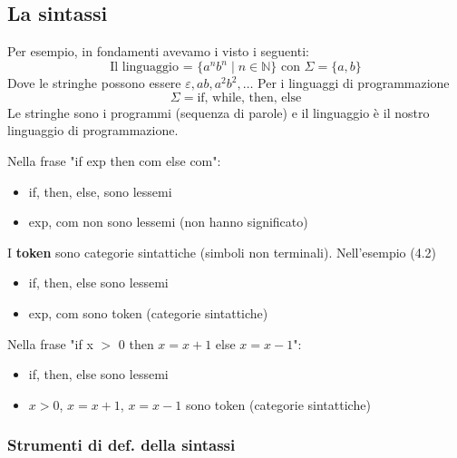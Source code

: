 \documentclass[a4paper]{article}
\begin{document}
\subsection{La sintassi}


\ex{}
{
    Per esempio, in fondamenti avevamo i visto i seguenti:
    \[\text{Il linguaggio = } \{a^nb^n \; | \; n \in \mathbb{N}\} \text{ con } \Sigma = \{a,b\}\]
    Dove le stringhe possono essere $\varepsilon, ab, a^2b^2, \dots$ 
    Per i linguaggi di programmazione 
    \[\Sigma = \text{if, while, then, else}\]
    Le stringhe sono i programmi (sequenza di parole) e il linguaggio è il nostro linguaggio di programmazione. 
}
\ex{}
{
    Nella frase "if exp then com else com":
    \begin{itemize}
        \item if, then, else, sono lessemi 
        \item exp, com non sono lessemi (non hanno significato)
    \end{itemize}
}

{
    I \textbf{token} sono categorie sintattiche (simboli non terminali). Nell'esempio (4.2)
    \begin{itemize}
        \item if, then, else sono lessemi 
        \item exp, com sono token (categorie sintattiche)
    \end{itemize}
}
\ex{}
{
    Nella frase "if x $>$ 0 then $x = x + 1$ else $x = x - 1$":
    \begin{itemize}
        \item if, then, else sono lessemi
        \item $x > 0$, $x = x + 1$, $x = x - 1$ sono token (categorie sintattiche)
    \end{itemize}
}

\subsubsection{Strumenti di def. della sintassi}
\end{document}
